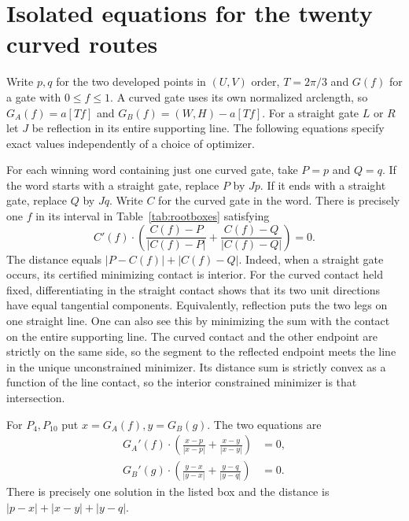 \section{Isolated equations for the twenty curved routes}\label{sec:roots}
Write $p,q$ for the two developed points in $(U,V)$ order, $T=2\pi/3$
and $G(f)$ for a gate with $0\le f\le1$. A curved gate uses its own
normalized arclength, so $G_A(f)=a[Tf]$ and
$G_B(f)=(W,H)-a[Tf]$. For a straight gate $L$ or $R$ let $J$
be reflection in its entire supporting line. The following equations
specify exact values independently of a choice of optimizer.

For each winning word containing just one curved gate, take $P=p$ and $Q=q$.
If the word starts with a straight gate, replace $P$ by $Jp$.
If it ends with a straight gate, replace $Q$ by $Jq$. Write $C$ for the
curved gate in the word. There is precisely one $f$ in its interval in
Table~\ref{tab:rootboxes} satisfying
\begin{equation}
 C'(f)\cdot\left(\frac{C(f)-P}{|C(f)-P|}
             +\frac{C(f)-Q}{|C(f)-Q|}\right)=0 .
 \label{eq:scalarcurve}
\end{equation}
The distance equals $|P-C(f)|+|C(f)-Q|$.
Indeed, when a straight gate occurs, its certified minimizing contact is
interior. For the curved contact held fixed, differentiating in the
straight contact shows that its two unit directions have equal tangential
components. Equivalently, reflection puts the two legs on one straight
line. One can also see this by minimizing the sum with the contact on
the entire supporting line. The curved contact and the other endpoint
are strictly on the same side, so the segment to the reflected endpoint
meets the line in the unique unconstrained minimizer. Its distance sum
is strictly convex as a function of the line contact, so the interior
constrained minimizer is that intersection.

For $P_4,P_{10}$ put $x=G_A(f),y=G_B(g)$. The two equations are
\begin{align}
 G_A'(f)\cdot\left(\frac{x-p}{|x-p|}+\frac{x-y}{|x-y|}\right)&=0,\nonumber\\
 G_B'(g)\cdot\left(\frac{y-x}{|y-x|}+\frac{y-q}{|y-q|}\right)&=0.
 \label{eq:doublecurve}
\end{align}
There is precisely one solution in the listed box and the distance is
$|p-x|+|x-y|+|y-q|$.

